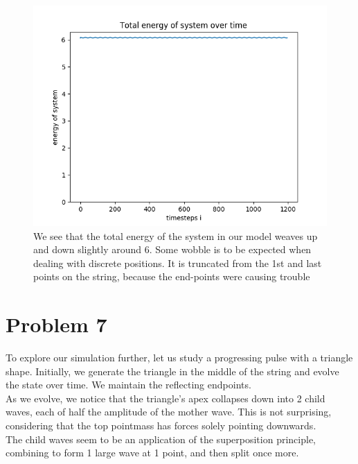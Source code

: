 \documentclass[12pt]{article}
\begin{document}
\begin{figure}[H]
	\includegraphics[scale=0.7]{SystemEnergy}
	\caption{We see that the total energy of the system in our model weaves up and down slightly around 6. Some wobble is to be expected when dealing with discrete positions. It is truncated from the 1st and last points on the string, because the end-points were causing trouble}
\end{figure}

\section*{Problem 7}
	To explore our simulation further, let us study a progressing pulse with a triangle shape. Initially, we generate the triangle in the middle of the string and evolve the state over time. We maintain the reflecting endpoints. \\
	As we evolve, we notice that the triangle's apex collapses down into 2 child waves, each of half the amplitude of the mother wave. This is not surprising, considering that the top pointmass has forces solely pointing downwards. \\
	The child waves seem to be an application of the superposition principle, combining to form 1 large wave at 1 point, and then split once more.  
\end{document}
